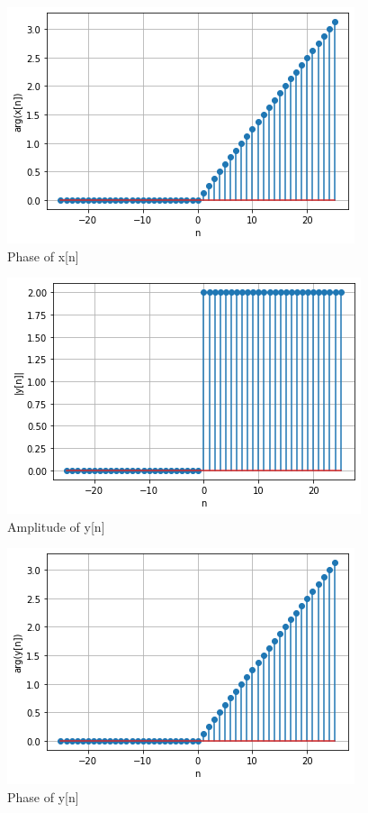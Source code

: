 \documentclass[journal,12pt,twocolumn]{IEEEtran}
\begin{document}
\begin{figure}[!htp]
    \centering
    \includegraphics[width = \columnwidth]{2.PNG}
    \caption{Phase of x[n]}
    \label{f2}
\end{figure}

\begin{figure}[!htp]
    \centering
    \includegraphics[width = \columnwidth]{3.PNG}
    \caption{Amplitude of y[n]}
    \label{f3}
\end{figure}

\begin{figure}[!htp]
    \centering
    \includegraphics[width = \columnwidth]{4.PNG}
    \caption{Phase of y[n]}
    \label{f4}
\end{figure}
\end{document}
